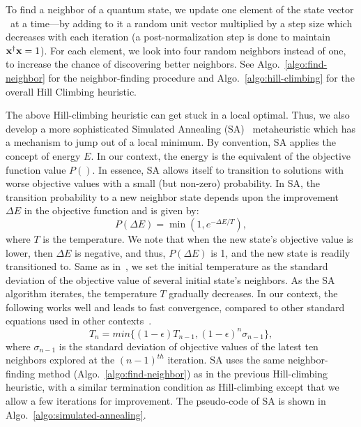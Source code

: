 To find a neighbor of a quantum state, 
we update one element of the state vector \vx\ at a time---by 
adding to it a random unit vector multiplied by a step size
which decreases with each iteration (a post-normalization 
step is done to maintain $\mathbf{x}^{\dagger}\mathbf{x} = 1$).
For each element, we look into four random neighbors instead of one, to increase the chance of discovering better neighbors.
See Algo.~\ref{algo:find-neighbor} for the neighbor-finding procedure and Algo.~\ref{algo:hill-climbing} for the overall Hill Climbing heuristic.




The above Hill-climbing heuristic can get stuck in a local optimal.
Thus, we also develop a more sophisticated Simulated Annealing 
(SA)~\cite{Kirkpatrick_1983} metaheuristic which has a mechanism to 
jump out of a local minimum.
By convention, SA applies the concept of energy $E$.
In our context, the energy is the equivalent of the objective function value $P()$.
In essence, SA allows itself to transition to solutions with worse objective values with a small (but non-zero) probability.
In SA, the transition probability to a new neighbor state depends upon the improvement
$\Delta E$ in the objective function and is given by: 
\begin{equation}
    P(\Delta E) = \min (1, e^{-\Delta E/T}),
    \label{eqn:boltzmann}
\end{equation}
where $T$ is the temperature.
We note that when the new state's objective value is lower, then $\Delta E$ is negative, and thus, $P(\Delta E)$ is 1, and the new state is readily transitioned to. 
Same as in~\cite{SA-sudoku}, we set the initial temperature as the standard deviation of the objective value of several initial state's neighbors. 
As the SA algorithm iterates, the temperature $T$ gradually decreases. 
In our context, the following works well and leads to fast convergence, compared to other standard equations used in other contexts~\cite{Laarhoven_1987}.
\begin{equation}
    T_{n} = min\{(1-\epsilon)T_{n-1}, (1 - \epsilon)^{n}\sigma_{n-1}\},
    \label{eqn:our-anneal}
\end{equation}
where $\sigma_{n-1}$ is the standard deviation of objective values of the latest ten neighbors explored at the $(n-1)^{th}$ iteration.
SA uses the same neighbor-finding method (Algo.~\ref{algo:find-neighbor}) as in the previous Hill-climbing heuristic, with a similar termination condition as Hill-climbing except that we 
allow a few iterations for improvement.
The pseudo-code of SA is shown in Algo.~\ref{algo:simulated-annealing}.


